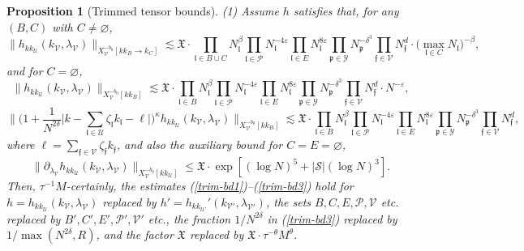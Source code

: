 \documentclass[11 pt,reqno]{amsart}
\newtheorem{prop}[thm]{Proposition}
\theoremstyle{definition}
\theoremstyle{remark}
\numberwithin{equation}{section}
\newcommand{\Sc}{\mathcal{S}}
\newcommand{\Pc}{\mathcal{P}}
\newcommand{\Uc}{\mathcal{U}}
\newcommand{\Vc}{\mathcal{V}}
\newcommand{\Yc}{\mathcal{Y}}
\newcommand{\pf}{\mathfrak{p}}
\newcommand{\ff}{\mathfrak{f}}
\newcommand{\Xf}{\mathfrak{X}}
\newcommand{\lf}{\mathfrak{l}}
\begin{document}
{\begin{prop}[Trimmed tensor bounds]
  (1) Assume $h$ satisfies that, for any $(B,C)$ with $C\neq\varnothing$,
  \begin{equation}\label{trim-bd1}\|h_{kk_\Uc}(k_\Vc,\lambda_\Vc)\|_{X_\Vc^{-b_0}[kk_B\to k_C]}\lesssim\Xf\cdot\prod_{\lf\in B\cup C}N_\lf^\beta\prod_{\lf\in\Pc}N_\lf^{-4\varepsilon}\prod_{\lf\in E}N_\lf^{8\varepsilon}\prod_{\pf\in\Yc}N_\pf^{-\delta^3}\prod_{\ff \in \Vc} N_\ff^d\cdot \big(\max_{\lf\in C}N_\lf\big)^{-\beta},
  \end{equation} and for $C=\varnothing$,
  \begin{equation}
 \label{trim-bd2}\|h_{kk_\Uc}(k_\Vc,\lambda_\Vc)\|_{X_\Vc^{-b_0}[kk_B]}\lesssim\Xf\cdot\prod_{\lf\in B}N_\lf^\beta\prod_{\lf\in\Pc}N_\lf^{-4\varepsilon}\prod_{\lf\in E}N_\lf^{8\varepsilon}\prod_{\pf\in\Yc}N_\pf^{-\delta^3}\prod_{\ff \in \Vc} N_\ff^d\cdot N^{-\varepsilon},
 \end{equation}
 \begin{equation} \label{trim-bd3}\bigg\|\bigg(1+\frac{1}{N^{2\delta}}\big|k-\sum_{\lf\in\Uc}\zeta_\lf k_\lf-\ell\big|\bigg)^\kappa h_{kk_\Uc}(k_\Vc,\lambda_\Vc)\bigg\|_{X_\Vc^{-b_0}[kk_B]}\lesssim\Xf\cdot\prod_{\lf\in B}N_\lf^\beta\prod_{\lf\in\Pc}N_\lf^{-4\varepsilon}\prod_{\lf\in E}N_\lf^{8\varepsilon}\prod_{\pf\in\Yc}N_\pf^{-\delta^3}\prod_{\ff \in \Vc} N_\ff^d,
 \end{equation} where $\ell=\sum_{\ff\in\Vc}\zeta_\ff k_\ff$, and also the auxiliary bound for $C=E=\varnothing$,
 \begin{equation}\label{trim-bd4}\|\partial_{\lambda_\Vc}h_{kk_\Uc}(k_\Vc,\lambda_\Vc)\|_{X_\Vc^{-b_0}[kk_\Uc]}\leq\Xf\cdot\exp[(\log N)^5+|\Sc|(\log N)^3].
 \end{equation} Then, $\tau^{-1}M$-certainly, the estimates (\ref{trim-bd1})--(\ref{trim-bd3}) hold for $h=h_{kk_\Uc}(k_\Vc,\lambda_\Vc)$ replaced by $h'=h_{kk_{\Uc'}}'(k_{\Vc'},\lambda_{\Vc'})$, the sets $B,C,E,\Pc,\Vc$ etc. replaced by $B',C',E',\Pc',\Vc'$ etc., the fraction $1/N^{2\delta}$ in (\ref{trim-bd3}) replaced by $1/\max(N^{2\delta},R)$, and the factor $\Xf$ replaced by $\Xf\cdot\tau^{-\theta}M^\theta$.
 

\end{prop}}
\end{document}
